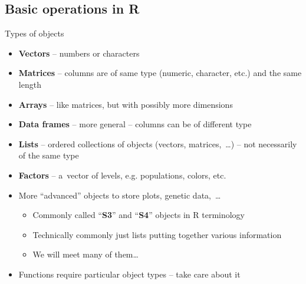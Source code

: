 \documentclass[compress, ucs, xelatex, 11pt, xcolor=svgnames,
  hyperref={
    bookmarks=true,
    unicode=true,
    colorlinks=true,
    pdftitle={Molecular data in R},
    plainpages=false,
    pdfauthor={Vojtech Zeisek},
    pdfsubject={Course about phylogeny and evolution in R},
    pdfcreator={XeLaTeX},
    pdfkeywords={R, evolution, phylogeny, molecular data},
    linkcolor=Tomato,
    anchorcolor=SaddleBrown,
    citecolor=Goldenrod,
    filecolor=DarkMagenta,
    menucolor=Sienna,
    urlcolor=DarkTurquoise,
    pdftex},
  url={hyphens, lowtilde} %
  ]{beamer}
\begin{document}
\subsection{Basic operations in R}

\begin{frame}{Types of objects}
  \begin{itemize}
    \item \textbf{Vectors} -- numbers or characters
    \item \textbf{Matrices} -- columns are of same type (numeric, character, etc.) and the same length
    \item \textbf{Arrays} -- like matrices, but with possibly more dimensions
    \item \textbf{Data frames} -- more general -- columns can be of different type
    \item \textbf{Lists} -- ordered collections of objects (vectors, matrices,~\ldots) -- not necessarily of the same type
    \item \textbf{Factors} -- a~vector of levels, e.g. populations, colors, etc.
    \item More ``advanced'' objects to store plots, genetic data,~\ldots
    \begin{itemize}
      \item Commonly called ``\textbf{S3}'' and ``\textbf{S4}'' objects in R terminology
      \item Technically commonly just lists putting together various information
      \item We will meet many of them\ldots
    \end{itemize}
  \item Functions require particular object types -- take care about it
  \end{itemize}
\end{frame}
\end{document}
